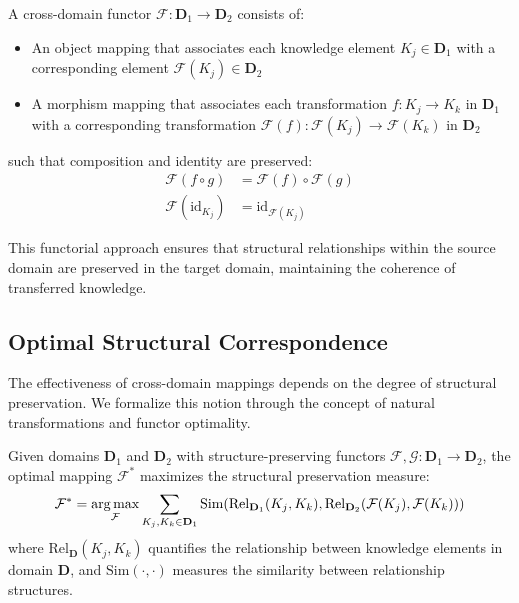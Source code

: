 \begin{definition}
A cross-domain functor $\mathcal{F}: \mathbf{D}_1 \rightarrow \mathbf{D}_2$ consists of:
\begin{itemize}
    \item An object mapping that associates each knowledge element $K_j \in \mathbf{D}_1$ with a corresponding element $\mathcal{F}(K_j) \in \mathbf{D}_2$
    \item A morphism mapping that associates each transformation $f: K_j \rightarrow K_k$ in $\mathbf{D}_1$ with a corresponding transformation $\mathcal{F}(f): \mathcal{F}(K_j) \rightarrow \mathcal{F}(K_k)$ in $\mathbf{D}_2$
\end{itemize}
such that composition and identity are preserved:
\begin{align}
\mathcal{F}(f \circ g) &= \mathcal{F}(f) \circ \mathcal{F}(g) \\
\mathcal{F}(\text{id}_{K_j}) &= \text{id}_{\mathcal{F}(K_j)}
\end{align}
\end{definition}

This functorial approach ensures that structural relationships within the source domain are preserved in the target domain, maintaining the coherence of transferred knowledge.

\subsection{Optimal Structural Correspondence}

The effectiveness of cross-domain mappings depends on the degree of structural preservation. We formalize this notion through the concept of natural transformations and functor optimality.

\begin{theorem}
Given domains $\mathbf{D}_1$ and $\mathbf{D}_2$ with structure-preserving functors $\mathcal{F}, \mathcal{G}: \mathbf{D}_1 \rightarrow \mathbf{D}_2$, the optimal mapping $\mathcal{F}^*$ maximizes the structural preservation measure:
\begin{equation}
\mathcal{F}^* = \mathop{\mathrm{arg\,max}}_{\mathcal{F}} \sum_{K_j, K_k \in \mathbf{D}_1} \text{Sim}(\text{Rel}_{\mathbf{D}_1}(K_j, K_k), \text{Rel}_{\mathbf{D}_2}(\mathcal{F}(K_j), \mathcal{F}(K_k)))
\end{equation}
where $\text{Rel}_{\mathbf{D}}(K_j, K_k)$ quantifies the relationship between knowledge elements in domain $\mathbf{D}$, and $\text{Sim}(\cdot,\cdot)$ measures the similarity between relationship structures.
\end{theorem}

